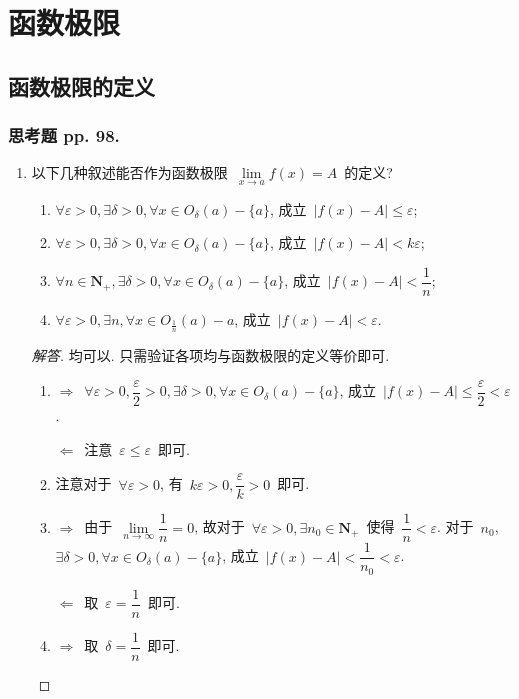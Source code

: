 \documentclass[UTF8,a4paper,11pt,twoside]{book}
\begin{document}
\chapter{函数极限}
\section{函数极限的定义}
\subsection{思考题 pp. 98.}
\begin{enumerate}
	\item 以下几种叙述能否作为函数极限~$\lim\limits_{x\to a} f(x)=A$~的定义?
	      \begin{enumerate}[(1)]
		      \item $\forall\varepsilon>0, \exists \delta>0, \forall x\in O_{\delta}(a)-\{a\}$, 成立~$|f(x)-A|\leqslant\varepsilon$;
		      \item $\forall\varepsilon>0, \exists \delta>0, \forall x\in O_{\delta}(a)-\{a\}$, 成立~$|f(x)-A|<k\varepsilon$;
		      \item $\forall n\in\mathbf{N}_{+}, \exists \delta>0, \forall x\in O_{\delta}(a)-\{a\}$, 成立~$|f(x)-A|<\dfrac{1}{n}$;
		      \item $\forall\varepsilon>0, \exists n, \forall x\in O_{\frac{1}{n}}(a)-{a}$, 成立~$|f(x)-A|<\varepsilon$.
	      \end{enumerate}
	      \begin{proof}[解答]
		      均可以. 只需验证各项均与函数极限的定义等价即可.
		      \begin{enumerate}[(1)]
			      \item $\Rightarrow$~$\forall\varepsilon>0, \dfrac{\varepsilon}{2}>0, \exists\delta>0, \forall x\in O_{\delta}(a)-\{a\}$,  成立~$|f(x)-A|\leqslant\dfrac{\varepsilon}{2}<\varepsilon$.

			            $\Leftarrow$~注意~$\varepsilon\leqslant\varepsilon$~即可.
			      \item 注意对于~$\forall\varepsilon>0$, 有~$k\varepsilon>0, \dfrac{\varepsilon}{k}>0$~即可.
			      \item $\Rightarrow$~由于~$\lim\limits_{n\to\infty} \dfrac{1}{n}=0$, 故对于~$\forall\varepsilon>0, \exists n_0\in\mathbf{N}_{+}$~使得~$\dfrac{1}{n}<\varepsilon$. 对于~$n_0$, $\exists\delta>0, \forall x\in O_{\delta}(a)-\{a\}$, 成立~$|f(x)-A|<\dfrac{1}{n_0}<\varepsilon$.

			            $\Leftarrow$~取~$\varepsilon=\dfrac{1}{n}$~即可.
			      \item $\Rightarrow$~取~$\delta=\dfrac{1}{n}$~即可.


\end{enumerate}
\end{proof}
\end{enumerate}
\end{document}
